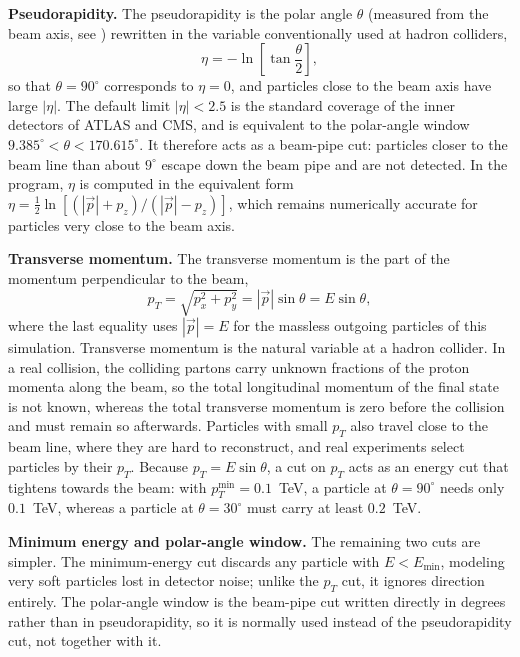 \documentclass{article}
\begin{document}
\par\textbf{Pseudorapidity.} The pseudorapidity is the polar angle $\theta$ (measured from the beam axis, see ) rewritten in the variable conventionally used at hadron colliders,
\begin{equation}
    \eta = -\ln\!\left[\tan\frac{\theta}{2}\right],
\end{equation}
so that $\theta = 90^\circ$ corresponds to $\eta = 0$, and particles close to the beam axis have large $|\eta|$. The default limit $|\eta| < 2.5$ is the standard coverage of the inner detectors of ATLAS and CMS, and is equivalent to the polar-angle window $9.385^\circ < \theta < 170.615^\circ$. It therefore acts as a beam-pipe cut: particles closer to the beam line than about $9^\circ$ escape down the beam pipe and are not detected. In the program, $\eta$ is computed in the equivalent form $\eta = \frac{1}{2}\ln\left[(|\vec{p}| + p_z)/(|\vec{p}| - p_z)\right]$, which remains numerically accurate for particles very close to the beam axis.

\par\textbf{Transverse momentum.} The transverse momentum is the part of the momentum perpendicular to the beam,
\begin{equation}
    p_T = \sqrt{p_x^2 + p_y^2} = |\vec{p}|\sin\theta = E\sin\theta,
\end{equation}
where the last equality uses $|\vec{p}| = E$ for the massless outgoing particles of this simulation. Transverse momentum is the natural variable at a hadron collider. In a real collision, the colliding partons carry unknown fractions of the proton momenta along the beam, so the total longitudinal momentum of the final state is not known, whereas the total transverse momentum is zero before the collision and must remain so afterwards. Particles with small $p_T$ also travel close to the beam line, where they are hard to reconstruct, and real experiments select particles by their $p_T$. Because $p_T = E\sin\theta$, a cut on $p_T$ acts as an energy cut that tightens towards the beam: with $p_T^{\min} = 0.1$~TeV, a particle at $\theta = 90^\circ$ needs only $0.1$~TeV, whereas a particle at $\theta = 30^\circ$ must carry at least $0.2$~TeV.

\par\textbf{Minimum energy and polar-angle window.} The remaining two cuts are simpler. The minimum-energy cut discards any particle with $E < E_{\min}$, modeling very soft particles lost in detector noise; unlike the $p_T$ cut, it ignores direction entirely. The polar-angle window is the beam-pipe cut written directly in degrees rather than in pseudorapidity, so it is normally used instead of the pseudorapidity cut, not together with it.
\end{document}

